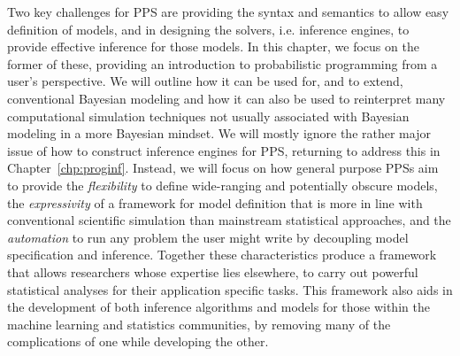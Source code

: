 Two key challenges for PPS are providing the
syntax and semantics to allow easy definition of models, and in designing the solvers, i.e.
inference engines, to provide effective inference for those models.
In this chapter, we focus on the former of these, providing an introduction to 
probabilistic programming from a user's perspective.  We will outline how it can be used for, and
to extend, conventional Bayesian modeling and how it can also be used to reinterpret many computational simulation
techniques not usually associated with Bayesian modeling in a more Bayesian mindset.
We will mostly ignore the rather major issue of how to construct inference engines for PPS, returning to address this in Chapter~\ref{chp:proginf}.
Instead, we will focus on how general purpose PPSs aim to  provide 
the \emph{flexibility} to define
wide-ranging and potentially obscure models, the \emph{expressivity} of a framework for 
model definition that is more in line with conventional scientific simulation than mainstream 
statistical approaches, and the \emph{automation} to  run any problem the user might write
by decoupling model specification and inference.
Together these characteristics produce a framework that allows researchers whose expertise 
lies elsewhere, to carry out powerful statistical analyses for their application specific tasks.  
This framework also aids in the development of both inference
algorithms and models for those within the machine learning and statistics communities,
by removing many of the complications of one while developing the other.
%


